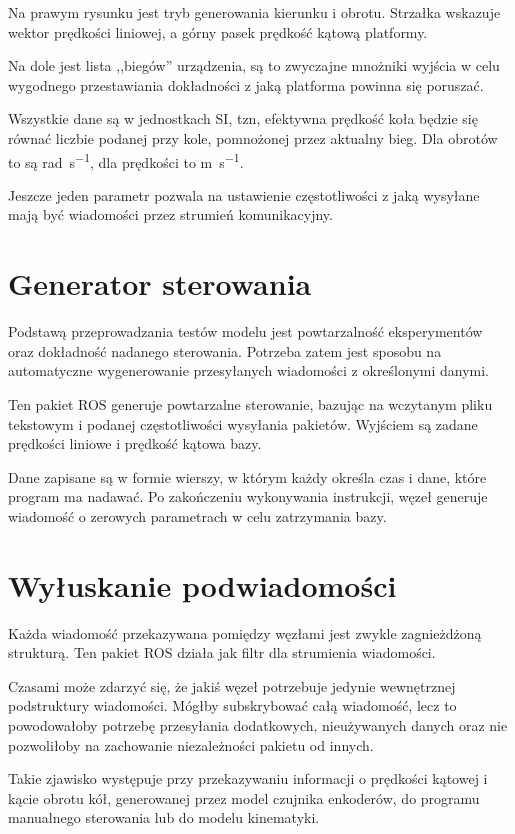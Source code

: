 	Na prawym rysunku jest tryb generowania kierunku i obrotu. Strzałka wskazuje wektor prędkości liniowej, a górny pasek prędkość kątową platformy.
	
	Na dole jest lista ,,biegów'' urządzenia, są to zwyczajne mnożniki wyjścia w celu wygodnego przestawiania dokładności z jaką platforma powinna się poruszać.
	
	Wszystkie dane są w jednostkach SI, tzn, efektywna prędkość koła będzie się równać liczbie podanej przy kole, pomnożonej przez aktualny bieg.
	Dla obrotów to są \si{\radian\per\second}, dla prędkości to \si{\metre\per\second}.
	
	Jeszcze jeden parametr pozwala na ustawienie częstotliwości z jaką wysyłane mają być wiadomości przez strumień komunikacyjny.
	
\section{Generator sterowania}
	\label{sec:gramofon}
	Podstawą przeprowadzania testów modelu jest powtarzalność eksperymentów oraz dokładność nadanego sterowania.
	Potrzeba zatem jest sposobu na automatyczne wygenerowanie przesyłanych wiadomości z określonymi danymi.
	
	Ten pakiet ROS generuje powtarzalne sterowanie, bazując na wczytanym pliku tekstowym i podanej częstotliwości wysyłania pakietów.
	Wyjściem są zadane prędkości liniowe i prędkość kątowa bazy.
	
	Dane zapisane są w formie wierszy, w którym każdy określa czas i dane, które program ma nadawać.
	Po zakończeniu wykonywania instrukcji, węzeł generuje wiadomość o zerowych parametrach w celu zatrzymania bazy.
	
		
\section{Wyłuskanie podwiadomości}
	\label{sec:dziadzio}
	Każda wiadomość przekazywana pomiędzy węzłami jest zwykle zagnieżdżoną strukturą.
	Ten pakiet ROS działa jak filtr dla strumienia wiadomości.
	
	Czasami może zdarzyć się, że jakiś węzeł potrzebuje jedynie wewnętrznej podstruktury wiadomości.
	Mógłby subskrybować całą wiadomość, lecz to powodowałoby potrzebę przesyłania dodatkowych, nieużywanych danych oraz nie pozwoliłoby na zachowanie niezależności pakietu od innych.
	
	Takie zjawisko występuje przy przekazywaniu informacji o prędkości kątowej i kącie obrotu kół, generowanej przez model czujnika enkoderów, do programu
	manualnego sterowania lub do modelu kinematyki. 
	
